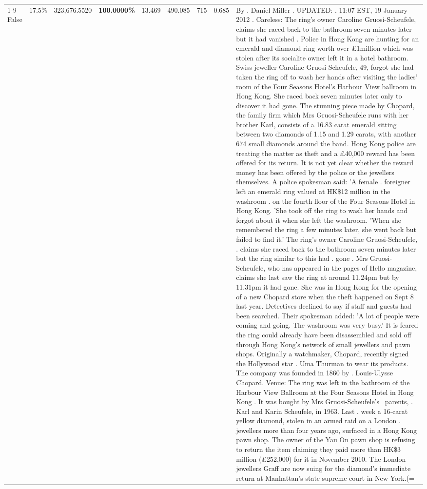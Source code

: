 \begin{table}[H]
\begin{tabular}{lllrlllll}
\cline{1-9}
False & 17.5\% & 323,676.5520 & \bfseries \color{red} 100.0000\% & 13.469 & 490.085 & 715 & 0.685 & By . Daniel Miller . UPDATED: . 11:07 EST, 19 January 2012 . Careless: The ring's owner Caroline Gruosi-Scheufele, claims she raced back to the bathroom seven minutes later but it had vanished . Police in Hong Kong are hunting for an emerald and diamond ring worth over £1million which was stolen after its socialite owner left it in a hotel bathroom. Swiss jeweller Caroline Gruosi-Scheufele, 49, forgot she had taken the ring off to wash her hands after visiting the ladies' room of the Four Seasons Hotel's Harbour View ballroom in Hong Kong. She raced back seven minutes later only to discover it had gone. The stunning piece made by Chopard, the family firm which Mrs Gruosi-Scheufele runs with her brother Karl, consists of a 16.83 carat emerald sitting between two diamonds of 1.15 and 1.29 carats, with another 674 small diamonds around the band. Hong Kong police are treating the matter as theft and a £40,000 reward has been offered for its return. It is not yet clear whether the reward money has been offered by the police or the jewellers themselves. A police spokesman said: 'A female . foreigner left an emerald ring valued at HK\$12 million in the washroom . on the fourth floor of the Four Seasons Hotel in Hong Kong. 'She took off the ring to wash her hands and forgot about it when she left the washroom. 'When she remembered the ring a few minutes later, she went back but failed to find it.' The ring's owner Caroline Gruosi-Scheufele, . claims she raced back to the bathroom seven minutes later but the ring similar to this had . gone . Mrs Gruosi-Scheufele, who has appeared in the pages of Hello magazine, claims she last saw the ring at around 11.24pm but by 11.31pm it had gone. She was in Hong Kong for the opening of a new Chopard store when the theft happened on Sept 8 last year. Detectives declined to say if staff and guests had been searched. Their spokesman added: 'A lot of people were coming and going. The washroom was very busy.' It is feared the ring could already have been disassembled and sold off through Hong Kong's network of small jewellers and pawn shops. Originally a watchmaker, Chopard, recently signed the Hollywood star . Uma Thurman to wear its products. The company was founded in 1860 by . Louis-Ulysse Chopard. Venue: The ring was left in the bathroom of the Harbour View Ballroom at the Four Seasons Hotel in Hong Kong . It was bought by Mrs Gruosi-Scheufele's  parents, . Karl and Karin Scheufele, in 1963. Last . week a 16-carat yellow diamond, stolen in an armed raid on a London . jewellers more than four years ago, surfaced in a Hong Kong pawn shop. The owner of the Yau On pawn shop is refusing to return the item claiming they paid more than HK\$3 million (£252,000) for it in November 2010. The London jewellers Graff are now suing for the diamond’s immediate return at Manhattan’s state supreme court in New York.(= \\

\end{tabular}
\end{table}
